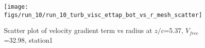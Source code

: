 \begin{figure}[H]
\centering
\texttt{[image: figs/run\_10/run\_10\_turb\_visc\_ettap\_bot\_vs\_r\_mesh\_scatter]}
\caption{Scatter plot of velocity gradient term vs radius at $z/c$=5.37, $V_{free}$=32.98, station1}
\label{fig:run_10_turb_visc_ettap_bot_vs_r_mesh_scatter}
\end{figure}


